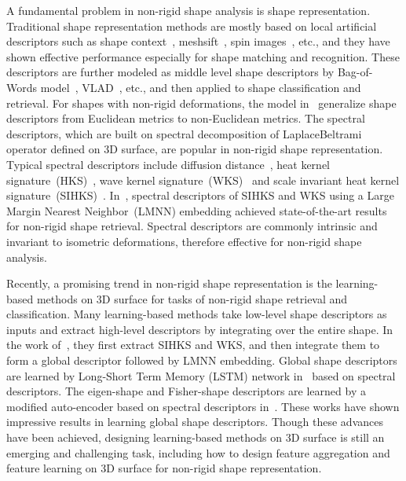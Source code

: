 \documentclass[runningheads]{llncs}
\begin{document}
A fundamental problem in non-rigid shape analysis is  shape representation. Traditional shape representation methods are mostly based on local artificial descriptors such as shape context~\cite{Shapecontext}, mesh\text{-}sift~\cite{Dirk,li2015towards}, spin images~\cite{Andrew}, etc., and they have shown effective performance especially for shape matching and recognition. These descriptors are further modeled as middle level shape descriptors by Bag-of-Words model~\cite{BOWVLAD1}, VLAD~\cite{VLAD}, etc., and then applied to shape classification and retrieval. 
For shapes with non-rigid deformations, the model in~\cite{elad2003on} generalize shape descriptors from Euclidean metrics to  non-Euclidean metrics. The spectral descriptors, which are built on spectral decomposition of Laplace\text{-}Beltrami operator defined on 3D surface, are popular in non-rigid shape representation. Typical spectral descriptors include diffusion distance~\cite{lafon2006data}, heat kernel signature~(HKS)~\cite{Jian}, wave kernel signature~(WKS)~\cite{MathieuWKS} and scale invariant heat kernel signature~(SIHKS)~\cite{MMB1}. In~\cite{Ioannis}, spectral descriptors of SIHKS and WKS using a Large Margin Nearest Neighbor~(LMNN) embedding achieved state-of-the-art results for non-rigid shape retrieval.   Spectral descriptors are commonly intrinsic and invariant to isometric deformations, therefore effective for non-rigid shape analysis. 

Recently, a promising  trend in non-rigid shape representation is the learning-based methods on 3D surface for tasks of non-rigid shape retrieval and classification.  Many learning-based methods take low-level shape descriptors as inputs and extract high-level descriptors by integrating over the entire shape. In the work of~\cite{Ioannis}, they first extract SIHKS and WKS, and then integrate them to form a global descriptor followed by LMNN embedding.  Global shape descriptors are learned by Long-Short Term Memory (LSTM) network in~\cite{YiFang1} based on spectral descriptors. The eigen-shape and Fisher-shape descriptors are learned by a modified auto-encoder based on spectral descriptors in~\cite{YiFang3}. 
These works have shown impressive results in learning global shape descriptors. Though these advances have been achieved, designing learning-based methods on 3D surface is still an emerging and challenging task, including how to design feature aggregation  and feature learning on 3D surface for non-rigid shape representation. 
\end{document}

